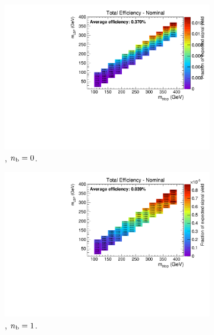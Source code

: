 \begin{figure}[h!]
  \centering
  \begin{subfigure}[b]{0.4\textwidth}
    \includegraphics[width=\textwidth, page=3]{Figs/sms/t2degen/v5/MHT_MET_T2_4body_v5_eq0b_le3j_incl.pdf}
    \caption{\njlow, $n_{\text{b}} = 0$.}
  \end{subfigure}
  \begin{subfigure}[b]{0.4\textwidth}
    \includegraphics[width=\textwidth, page=3]{Figs/sms/t2degen/v5/MHT_MET_T2_4body_v5_eq1b_le3j_incl.pdf}
    \caption{\njlow, $n_{\text{b}} = 1$.}
  \end{subfigure}\\
  \begin{subfigure}[b]{0.4\textwidth}

\end{subfigure}
\end{figure}
